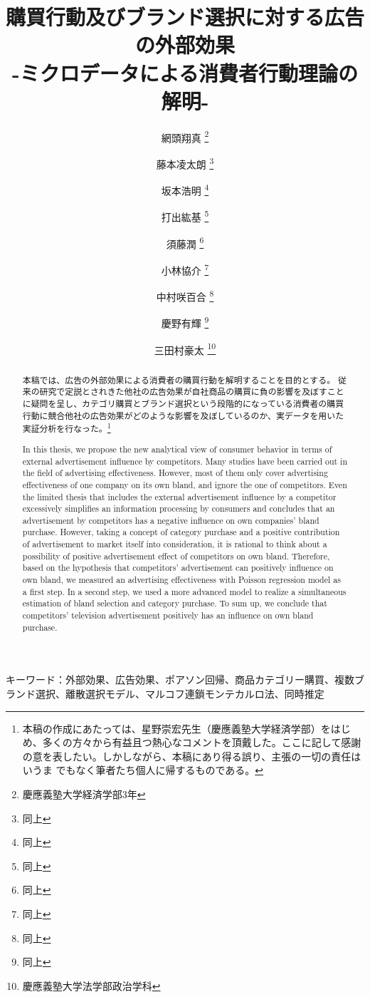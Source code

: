 \documentclass[11pt]{jsarticle}
\title{購買行動及びブランド選択に対する広告の外部効果\\-ミクロデータによる消費者行動理論の解明-}
\author{網頭翔真 \thanks{慶應義塾大学経済学部3年} \and 藤本凌太朗 \thanks{同上} \and 坂本浩明 \thanks{同上} \and 打出紘基 \thanks{同上} \\ \and 須藤潤 \thanks{同上} \and 小林協介 \thanks{同上} \and 中村咲百合 \thanks{同上} \and 慶野有輝 \thanks{同上}\and 三田村豪太 \thanks{慶應義塾大学法学部政治学科}}
\begin{document}
\maketitle

 \thispagestyle{empty}

\begin{abstract}
本稿では、広告の外部効果による消費者の購買行動を解明することを目的とする。
従来の研究で定説とされきた他社の広告効果が自社商品の購買に負の影響を及ぼすことに疑問を呈し、カテゴリ購買とブランド選択という段階的になっている消費者の購買行動に競合他社の広告効果がどのような影響を及ぼしているのか、実データを用いた実証分析を行なった。\footnote{本稿の作成にあたっては、星野崇宏先生（慶應義塾大学経済学部）をはじめ、多くの方々から有益且つ熱心なコメントを頂戴した。ここに記して感謝の意を表したい。しかしながら、本稿にあり得る誤り、主張の一切の責任はいうま でもなく筆者たち個人に帰するものである。}

In this thesis, we propose the new analytical view of consumer behavior in terms of external advertisement influence by competitors. Many studies have been carried out in the field of advertising effectiveness. However, most of them only cover advertising effectiveness of one company on its own bland, and ignore the one of competitors. Even the limited thesis that includes the external advertisement influence by a competitor excessively simplifies an information processing by consumers and concludes that an advertisement by competitors has a negative influence on own companies’ bland purchase. However, taking a concept of category purchase and a positive contribution of advertisement to market itself  into consideration, it is rational to think about a possibility of positive advertisement effect of competitors on own bland. Therefore, based on the hypothesis that competitors’ advertisement can positively influence on own bland, we measured an advertising effectiveness with Poisson regression model as a first step. In a second step, we used a more advanced model to realize a simultaneous estimation of bland selection and category purchase. To sum up, we conclude that competitors’ television advertisement positively has an influence on own bland purchase.
\end{abstract}

\begin{center}
キーワード：外部効果、広告効果、ポアソン回帰、商品カテゴリー購買、複数ブランド選択、離散選択モデル、マルコフ連鎖モンテカルロ法、同時推定\\

\end{center}
\end{document}
